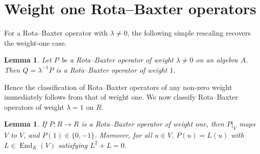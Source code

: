 \documentclass[a4paper,11pt]{elsarticle}
\newtheorem{lemma}[theorem]{Lemma}
\theoremstyle{definition}
\theoremstyle{remark}
\DeclareMathOperator{\End}{End}
\begin{document}
\section{Weight one Rota--Baxter operators}\label{sec:wt1}

For a Rota--Baxter operator with $\lambda \neq 0$, the following simple rescaling recovers the weight‑one case.

\begin{lemma}\cite{Guo}\label{lem:rescale}
Let $P$ be a Rota--Baxter operator of weight $\lambda \neq 0$ on an algebra $A$.  Then $Q = \lambda^{-1} P$ is a Rota--Baxter operator of weight $1$.
\end{lemma}
Hence the classification of Rota--Baxter operators of any non‑zero weight immediately follows from that of weight one.
We now classify Rota--Baxter operators of weight $\lambda = 1$ on $R$.

\begin{lemma}\label{lem:wt1_form}
If $P : R \to R$ is a Rota--Baxter operator of weight one, then $P|_V$ maps $V$ to $V$, and  $P(1) \in \{0, -1\}$.  Moreover, for all $u \in V$, $P(u) = L(u)$ with $L \in \End_K(V)$ satisfying $L^2 + L = 0$.
\end{lemma}
\end{document}
